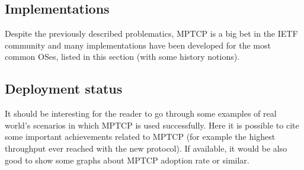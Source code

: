 \subsection{Implementations}
Despite the previously described problematics, MPTCP is a big bet in the IETF community and many implementations have been developed for the most common OSes, listed in this section (with some history notions).

\subsection{Deployment status}
It should be interesting for the reader to go through some examples of real world's scenarios in which MPTCP is used successfully. Here it is possible to cite some important achievements related to MPTCP (for example the highest throughput ever reached with the new protocol).
If available, it would be also good to show some graphs about MPTCP adoption rate or similar.